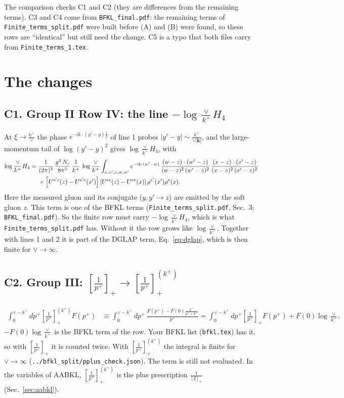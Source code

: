 \documentclass[9pt]{article}
\numberwithin{equation}{section}
\begin{document}
The comparison checks C1 and C2 (they are differences from the remaining terms). C3 and C4 come from \texttt{BFKL\_final.pdf}: the remaining terms of \texttt{Finite\_terms\_split.pdf} were built before (A) and (B) were found, so these rows are ``identical'' but still need the change. C5 is a typo that both files carry from \texttt{Finite\_terms\_1.tex}.

\section{The changes}\label{sec:changes}
\subsection*{C1. Group II Row IV: the line $-\log\frac{\vee}{k^+}H_4$}
At $\xi\to\frac{k^+}{\vee}$ the phase $e^{-ik\cdot(y'-y)\frac1\xi}$ of line 1 probes $|y'-y|\sim\frac{k^+}{\vee|\mathbf k|}$, and the large-momentum tail of $\log(y'-y)^2$ gives $\log\frac{\vee}{k^+}H_4$, with
\begin{align}
\log\frac{\vee}{k^+}H_4={}&\frac{1}{(2\pi)^{3}}\,\frac{g^{4}\,N_{c}}{8\pi^{5}}\,\frac{1}{k^{+}}\,\log\frac{\vee}{k^{+}}\int_{x,x',z,w,w'}e^{-ik\cdot (w'-w)}\,\frac{(w-z)\cdot(w'-z)}{(w-z)^{2}\,(w'-z)^{2}}\,\frac{(x-z)\cdot(x'-z)}{(x-z)^{2}\,(x'-z)^{2}}\notag\\
&\times\left[U^{e'c}(z) - U^{e'c}(x')\right]\left[U^{ec}(z) - U^{ce}(x)\right]\rho^{e'}(x') \rho^{e}(x).
\end{align}
Here the measured gluon and its conjugate ($y,y'\to z$) are emitted by the soft gluon $z$. This term is one of the BFKL terms (\texttt{Finite\_terms\_split.pdf}, Sec.~3; \texttt{BFKL\_final.pdf}). So the finite row must carry $-\log\frac{\vee}{k^+}H_4$, which is what \texttt{Finite\_terms\_split.pdf} has. Without it the row grows like $\log\frac{\vee}{k^+}$. Together with lines 1 and 2 it is part of the DGLAP term, Eq.~\eqref{eq:dglap}, which is then finite for $\vee\to\infty$.

\subsection*{C2. Group III: $\left[\frac{1}{p^+}\right]_+\to\left[\frac{1}{p^+}\right]_+^{(k^+)}$}
\begin{align}
\int_0^{\vee-k^+}\!dp^+\left[\frac{1}{p^+}\right]_+^{(k^+)}F(p^+)&\equiv\int_0^{\vee-k^+}\!dp^+\,\frac{F(p^+)-F(0)\frac{k^+}{p^++k^+}}{p^+}=\int_0^{\vee-k^+}\!dp^+\left[\frac{1}{p^+}\right]_+F(p^+)+F(0)\log\frac{\vee}{k^+}.
\end{align}
$-F(0)\log\frac{\vee}{k^+}$ is the BFKL term of the row. Your BFKL list (\texttt{bfkl.tex}) has it, so with $\left[\frac{1}{p^+}\right]_+$ it is counted twice. With $\left[\frac{1}{p^+}\right]_+^{(k^+)}$ the integral is finite for $\vee\to\infty$ (\texttt{../bfkl\_split/pplus\_check.json}). The term is still not evaluated. In the variables of AABKL, $\left[\frac{1}{p^+}\right]_+^{(k^+)}$ is the plus prescription $\frac{1}{[\xi]_+}$ (Sec.~\ref{sec:aabkl}).
\end{document}
